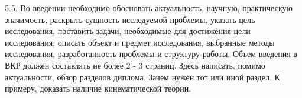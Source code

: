 5.5.	Во введении необходимо обосновать актуальность, научную,
практическую значимость, раскрыть сущность исследуемой проблемы,
указать цель исследования, поставить задачи, необходимые для
достижения цели исследования, описать объект и предмет исследования, 
выбранные методы исследования,
разработанность проблемы и структуру работы.
   Объем введения в ВКР должен составлять не более 2 - 3 страниц.
Здесь написать, помимо актуальности, обзор разделов диплома. Зачем нужен тот или иной раздел.
К примеру, доказать наличие кинематической теории.
